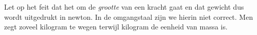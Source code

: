 \documentclass{ximera}
\begin{document}
	\author{Bart Lambregs}
    \xmsource\xmuitleg




	
	
	
	Let op het feit dat het om de \textit{grootte} van een kracht gaat en dat gewicht dus wordt uitgedrukt in newton. In de omgangstaal zijn we hierin niet correct. Men zegt zoveel kilogram te wegen terwijl kilogram de eenheid van massa is.
	
	
	
	
\end{document}
